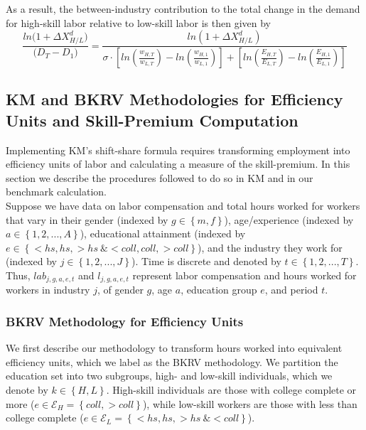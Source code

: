 \documentclass[10pt]{article}
\begin{document}
As a result, the between-industry contribution to the total change in the demand for high-skill labor relative to low-skill labor is then given by
\begin{equation} \label{eq:between_ind_contribution}
\frac{ln\Big(1+\Delta X^{d}_{ H/L } \Big)}{\Big(D_{T}-D_{1}\Big)} 
= \frac{ln\left(1+\Delta X^{d}_{ H/L }\right)}{\sigma \cdot \left[ln \left(\frac{w_{H,T}}{w_{L,T}}\right)-ln\left(\frac{w_{H,1}}{w_{L,1}}\right)\right]+\left[ln\left(\frac{E_{H,T}}{E_{L,T}}\right)-ln\left(\frac{E_{H,1}}{E_{L,1}}\right)\right]}
\end{equation}
\medskip
\subsection{KM and BKRV Methodologies for Efficiency Units and Skill-Premium Computation} \label{sec: KM_BKRV_eff} 
Implementing KM's shift-share formula requires transforming employment into efficiency units of labor and calculating a measure of the skill-premium. In this section we describe the procedures followed to do so in KM and in our benchmark calculation.\\

Suppose we have data on labor compensation and total hours worked for workers that vary in their gender (indexed by $g \in \left\lbrace m,f \right\rbrace$), age/experience (indexed by $a \in \left\lbrace 1,2,...,A \right\rbrace$), educational attainment (indexed by $e \in \left\lbrace <hs, hs , >hs \ \& <coll , coll , >coll \right\rbrace$), and the industry they work for (indexed by $j \in \left\lbrace 1,2,...,J \right\rbrace$). Time is discrete and denoted by $t \in \left\lbrace 1,2,...,T \right\rbrace$.
Thus, $lab_{j,g,a,e,t}$ and $l_{j,g,a,e,t}$ represent labor compensation and hours worked for workers in industry $j$, of gender $g$, age $a$, education group $e$, and period $t$.\\

\subsubsection{BKRV Methodology for Efficiency Units} \label{subsec:bkrv_eff_methodology}
We first describe our methodology to transform hours worked into equivalent efficiency units, which we label as the BKRV methodology. We partition the education set into two subgroups, high- and low-skill individuals, which we denote by $k \in \left\lbrace H,L \right\rbrace$. High-skill individuals are those with college complete or more ($ e \in \mathcal{E} _{H}= \left\lbrace coll,>coll \right\rbrace$), while low-skill workers are those with less than college complete ($ e \in \mathcal{E} _{L}= \left\lbrace <hs,hs,>hs \ \& <coll  \right\rbrace$).\\
\end{document}
